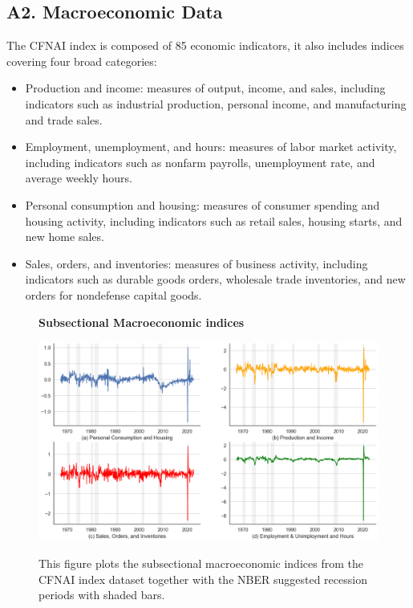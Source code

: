 \subsection*{A2. Macroeconomic Data}\label{sec:appendixa2}
The CFNAI index is composed of 85 economic indicators, it also includes indices covering four broad categories:
\begin{itemize}
  \item Production and income: measures of output, income, and sales, including indicators such as industrial production, personal income, and manufacturing and trade sales.

  \item Employment, unemployment, and hours: measures of labor market activity, including indicators such as nonfarm payrolls, unemployment rate, and average weekly hours.
  
  \item Personal consumption and housing: measures of consumer spending and housing activity, including indicators such as retail sales, housing starts, and new home sales.
  
  \item Sales, orders, and inventories: measures of business activity, including indicators such as durable goods orders, wholesale trade inventories, and new orders for nondefense capital goods.
\end{itemize}

\begin{figure}[H]
  \centering
  \caption{\textbf{Subsectional Macroeconomic indices}}
  \includegraphics[width=.8\textwidth]{images/cfnai_four_components.png}
  \label{fig: Subsectional Macroeconomic index}
  \caption*{\footnotesize{This figure plots the subsectional macroeconomic indices from the CFNAI index dataset together with the NBER suggested recession periods with shaded bars.}}
\end{figure} 

